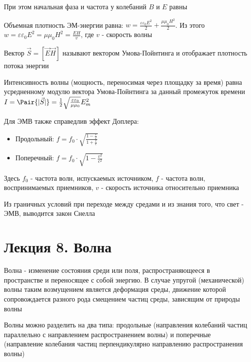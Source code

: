 \documentclass[12pt]{article}
\begin{document}
При этом начальная фаза и частота у колебаний $B$ и $E$ равны

Объемная плотность ЭМ-энергии равна: $w = \frac{\varepsilon \varepsilon_0 E^2}{2} + \frac{\mu \mu_0 H^2}{2}$. 
Из этого $w = \varepsilon \varepsilon_0 E^2 = \mu \mu_0 H^2 = \frac{EH}{v}$, где $v$ - скорость волны

Вектор $\vec S = [\vec E \vec H]$ называют вектором Умова-Пойнтинга и отображает плотность потока энергии 

Интенсивность волны (мощность, переносимая через площадку за время) равна усредненному модулю вектора Умова-Пойнтинга за данный промежуток времени $I = \Pair{|\vec S|} = \frac{1}{2} \sqrt{\frac{\varepsilon \varepsilon_0}{\mu \mu_0}} E^2_m$

Для ЭМВ также справедлив эффект Доплера:

\begin{itemize}
    \item Продольный: $f = f_0 \cdot \sqrt{\frac{1 - \frac{v}{c}}{1 + \frac{v}{c}}}$

    \item Поперечный: $f = f_0 \cdot \sqrt{1 - \frac{v^2}{c^2}}$
\end{itemize}

Здесь $f_0$ - частота волн, испускаемых источником, $f$ - частота волн, воспринимаемых приемников, $v$ - скорость источника относительно приемника

Из граничных условий при переходе между средами и из знания того, что свет - ЭМВ, выводится закон Снелла






\section{Лекция 8. Волна}

Волна - изменение состояния среди или поля, распространяющееся в пространстве и переносящее с собой энергию.
В случае упругой (механической) волны таким возмущением является деформация среды, движение которой сопровождается
разного рода смещением частиц среды, зависящим от природы волны

Волны можно разделить на два типа: продольные (направления колебаний частиц параллельно с направлением распространением волны) 
и поперечные (направление колебания частиц перпендикулярно направлению распространения волны)
\end{document}

